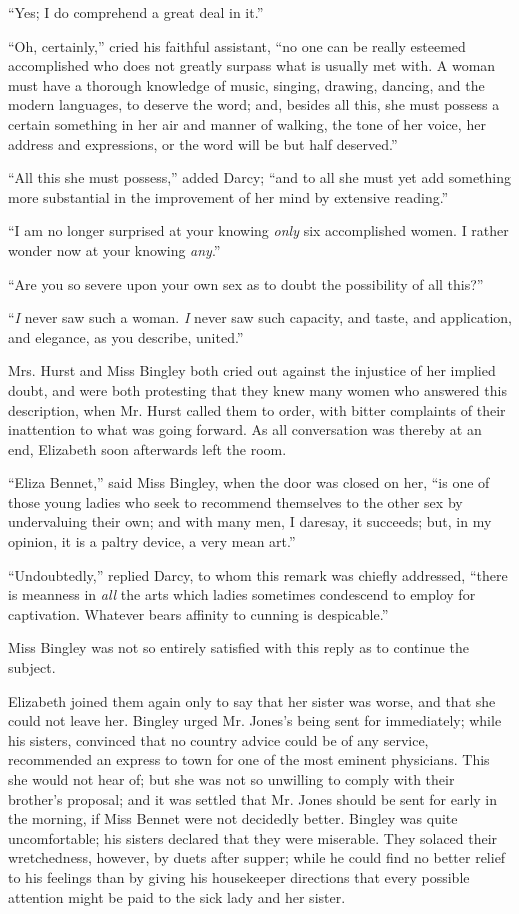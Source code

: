 \documentclass[12pt]{book}
\begin{document}
``Yes; I do comprehend a great deal in it.''

``Oh, certainly,'' cried his faithful assistant, ``no one can be really esteemed accomplished who does not greatly surpass what is usually met with. A woman must have a thorough knowledge of music, singing, drawing, dancing, and the modern languages, to deserve the word; and, besides all this, she must possess a certain something in her air and manner of walking, the tone of her voice, her address and expressions, or the word will be but half deserved.''

``All this she must possess,'' added Darcy; ``and to all she must yet add something more substantial in the improvement of her mind by extensive reading.''

``I am no longer surprised at your knowing \textit{only} six accomplished women. I rather wonder now at your knowing \textit{any}.''

``Are you so severe upon your own sex as to doubt the possibility of all this?''

``\textit{I} never saw such a woman. \textit{I} never saw such capacity, and taste, and application, and elegance, as you describe, united.''

Mrs. Hurst and Miss Bingley both cried out against the injustice of her implied doubt, and were both protesting that they knew many women who answered this description, when Mr. Hurst called them to order, with bitter complaints of their inattention to what was going forward. As all conversation was thereby at an end, Elizabeth soon afterwards left the room.

``Eliza Bennet,'' said Miss Bingley, when the door was closed on her, ``is one of those young ladies who seek to recommend themselves to the other sex by undervaluing their own; and with many men, I daresay, it succeeds; but, in my opinion, it is a paltry device, a very mean art.''

``Undoubtedly,'' replied Darcy, to whom this remark was chiefly addressed, ``there is meanness in \textit{all} the arts which ladies sometimes condescend to employ for captivation. Whatever bears affinity to cunning is despicable.''

Miss Bingley was not so entirely satisfied with this reply as to continue the subject.

Elizabeth joined them again only to say that her sister was worse, and that she could not leave her. Bingley urged Mr. Jones's being sent for immediately; while his sisters, convinced that no country advice could be of any service, recommended an express to town for one of the most eminent physicians. This she would not hear of; but she was not so unwilling to comply with their brother's proposal; and it was settled that Mr. Jones should be sent for early in the morning, if Miss Bennet were not decidedly better. Bingley was quite uncomfortable; his sisters declared that they were miserable. They solaced their wretchedness, however, by duets after supper; while he could find no better relief to his feelings than by giving his housekeeper directions that every possible attention might be paid to the sick lady and her sister.
\end{document}
